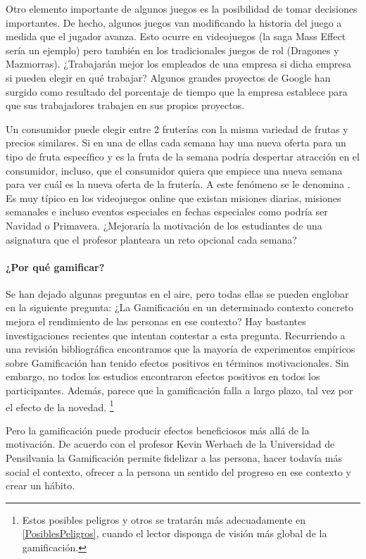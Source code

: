 Otro elemento importante de algunos juegos es la posibilidad de tomar decisiones importantes.
%
De hecho, algunos juegos van modificando la historia del juego a medida que el jugador avanza. 
%
Esto ocurre en videojuegos (la saga Mass Effect sería un ejemplo) pero también en los tradicionales juegos de rol (Dragones y Mazmorras).
%
¿Trabajarán mejor los empleados de una empresa si dicha empresa si pueden elegir en qué trabajar?
%
Algunos grandes proyectos de Google han surgido como resultado del porcentaje de tiempo que la empresa establece para que sus trabajadores trabajen en sus propios proyectos.

Un consumidor puede elegir entre 2 fruterías con la misma variedad de frutas y precios similares.
%
Si en una de ellas cada semana hay una nueva oferta para un tipo de fruta específico y es la fruta de la semana podría despertar atracción en el consumidor, incluso, que el consumidor quiera que empiece una nueva semana para ver cuál es la nueva oferta de la frutería.
%
A este fenómeno se le denomina . 
%
Es muy típico en los videojuegos online que existan misiones diarias, misiones semanales e incluso eventos especiales en fechas especiales como podría ser Navidad o Primavera.
%
¿Mejoraría la motivación de los estudiantes de una asignatura que el profesor planteara un reto opcional cada semana?



\paragraph{¿Por qué gamificar?} Se han dejado algunas preguntas en el aire, pero todas ellas se pueden englobar en la siguiente pregunta: ¿La Gamificación en un determinado contexto concreto mejora el rendimiento de las personas en ese contexto?
%
Hay bastantes investigaciones recientes que intentan contestar a esta pregunta.
%
Recurriendo a una revisión bibliográfica \cite{EmpiricalGamification} encontramos que la mayoría de experimentos empíricos sobre Gamificación han tenido efectos positivos en términos motivacionales.
%
Sin embargo, no todos los estudios encontraron efectos positivos en todos los participantes.
%
Además, parece que la gamificación falla a largo plazo, tal vez por el efecto de la novedad. 
%
\footnote{Estos posibles peligros y otros se tratarán más adecuadamente en \ref{PosiblesPeligros}, cuando el lector disponga de visión más global de la gamificación.}

Pero la gamificación puede producir efectos beneficiosos más allá de la motivación.
% 
De acuerdo con el profesor Kevin Werbach de la Universidad de Pensilvania la Gamificación permite fidelizar a las persona, hacer todavía más social el contexto, ofrecer a la persona un sentido del progreso en ese contexto y crear un hábito.



